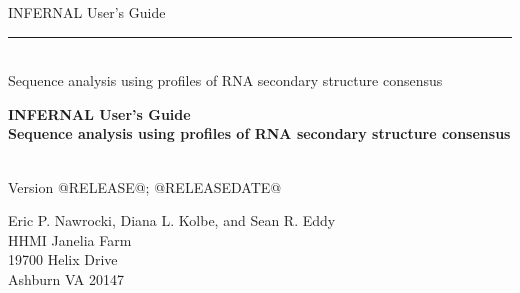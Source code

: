\begin{titlepage}
{\Large

\vspace*{\fill}

\begin{latexonly}
\noindent
{\Huge \textsf{INFERNAL User's Guide}} \\ 
\rule[2pt]{\textwidth}{1pt} \\
\hspace*{\fill} {\large \textsf{Sequence analysis using profiles of RNA secondary structure consensus}\\}
\end{latexonly}

\begin{htmlonly}
\begin{center}
{\Huge \textbf{INFERNAL User's Guide}}\\
{\large \textbf{Sequence analysis using profiles of RNA secondary
structure consensus}}\\
\end{center}
\end{htmlonly}

\vspace*{\fill}

\begin{center}
\textsl{}\\
Version @RELEASE@; @RELEASEDATE@ \\ 

\vspace*{\fill}

Eric P. Nawrocki, Diana L. Kolbe, and Sean R. Eddy\\
HHMI Janelia Farm\\
19700 Helix Drive\\
Ashburn VA 20147\\
\textsl{} \\
\end{center}

\vspace*{\fill}

}
\end{titlepage}
